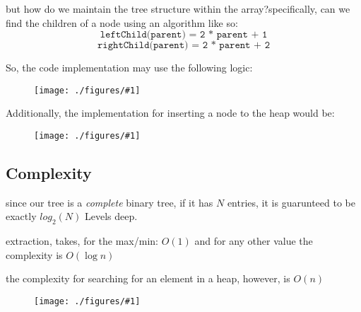 \documentclass[12pt]{book}
\newcommand{\incimg}[2]{%
       \begin{figure}[h]
               \centering
               \texttt{[image: ./figures/\#1]}
       \end{figure}
}
\begin{document}
but how do we maintain the tree structure within the array?specifically, can we find the children of a node using an algorithm like so:
\[\texttt{leftChild(parent) = 2 * parent + 1} \] 
\[\texttt{rightChild(parent) = 2 * parent + 2}\]

So, the code implementation may use the following logic:
\incimg{extractCode}{0.5}
\pagebreak

Additionally, the implementation for inserting a node to the heap would be:
\incimg{addCode}{0.5}

\subsection*{Complexity}
since our tree is a \textit{complete} binary tree, if it has $N$ entries, it is guarunteed to be exactly $log_2(N)$ Levels deep.

extraction, takes, for the max/min: $O(1)$ and for any other value the complexity is $O(\log n)$

the complexity for searching for an element in a heap, however, is $O(n)$
\incimg{complexity}{0.5}
\end{document}

